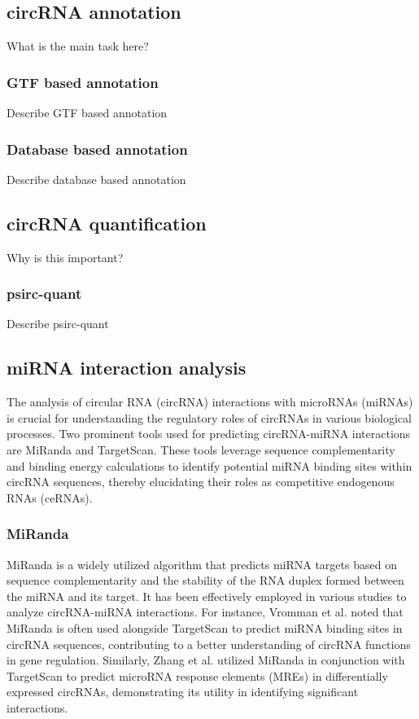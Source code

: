 \subsection{circRNA annotation}
What is the main task here?

\subsubsection{GTF based annotation}
Describe GTF based annotation

\subsubsection{Database based annotation}
Describe database based annotation

\subsection{circRNA quantification}

Why is this important?

\subsubsection{psirc-quant}
Describe psirc-quant

\subsection{miRNA interaction analysis}
The analysis of circular RNA (circRNA) interactions with microRNAs (miRNAs) is
crucial for understanding the regulatory roles of circRNAs in various biological
processes. Two prominent tools used for predicting circRNA-miRNA interactions
are MiRanda and TargetScan. These tools leverage sequence complementarity and
binding energy calculations to identify potential miRNA binding sites within
circRNA sequences, thereby elucidating their roles as competitive endogenous
RNAs (ceRNAs).

\subsubsection{MiRanda}
MiRanda is a widely utilized algorithm that predicts miRNA targets based on
sequence complementarity and the stability of the RNA duplex formed between the
miRNA and its target. It has been effectively employed in various studies to
analyze circRNA-miRNA interactions. For instance, Vromman et al. noted that
MiRanda is often used alongside TargetScan to predict miRNA binding sites in
circRNA sequences, contributing to a better understanding of circRNA functions
in gene regulation\supercite{vromman_closing_2021}. Similarly, Zhang et al. utilized
MiRanda in conjunction with TargetScan to predict microRNA response elements
(MREs) in differentially expressed circRNAs, demonstrating its utility in
identifying significant interactions\supercite{zhang_microarray_2017}.

